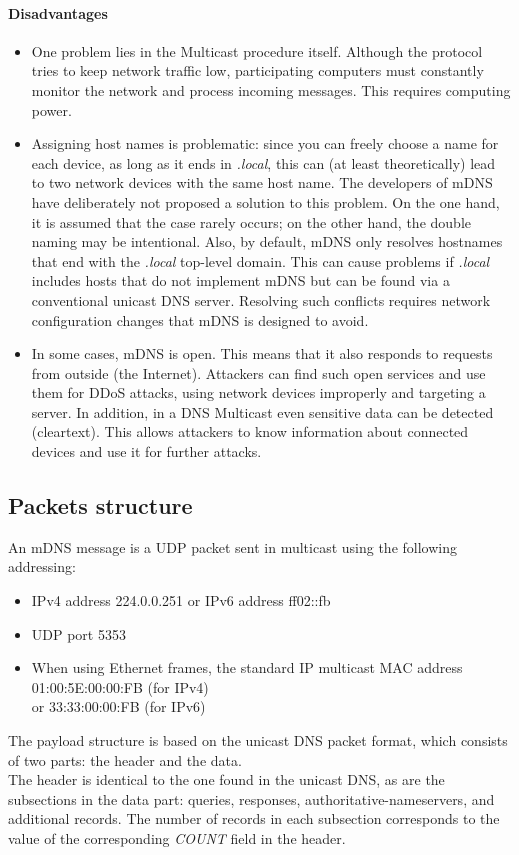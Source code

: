 \documentclass[fleqn, 10pt]{SelfArx} %
\begin{document}
\paragraph{Disadvantages} 
\begin{itemize}[leftmargin=*]
    \item One problem lies in the Multicast procedure itself. Although the protocol tries to keep network traffic low, participating computers must constantly monitor the network and process incoming messages. This requires computing power.
    \item Assigning host names is problematic: since you can freely choose a name for each device, as long as it ends in {\it{.local}}, this can (at least theoretically) lead to two network devices with the same host name.
The developers of mDNS have deliberately not proposed a solution to this problem. On the one hand, it is assumed that the case rarely occurs; on the other hand, the double naming may be intentional. Also, by default, mDNS only resolves hostnames that end with the {\it{.local}} top-level domain. This can cause problems if {\it{.local}} includes hosts that do not implement mDNS but can be found via a conventional unicast DNS server. Resolving such conflicts requires network configuration changes that mDNS is designed to avoid.
    \item In some cases, mDNS is open. This means that it also responds to requests from outside (the Internet). Attackers can find such open services and use them for DDoS attacks, using network devices improperly and targeting a server. In addition, in a DNS Multicast even sensitive data can be detected (cleartext). This allows attackers to know information about connected devices and use it for further attacks.
\end{itemize}

\subsection{Packets structure}
An mDNS message is a UDP packet sent in multicast using the following addressing:
\begin{itemize}[leftmargin=*]
    \item IPv4 address 224.0.0.251 or IPv6 address ff02::fb
    \item UDP port 5353
    \item When using Ethernet frames, the standard IP multicast MAC address 01:00:5E:00:00:FB (for IPv4) \\or 33:33:00:00:FB (for IPv6)
\end{itemize}
The payload structure is based on the unicast DNS packet format, which consists of two parts: the header and the data.\\
The header is identical to the one found in the unicast DNS, as are the subsections in the data part: queries, responses, authoritative-nameservers, and additional records. The number of records in each subsection corresponds to the value of the corresponding {\it{COUNT}} field in the header.
\end{document}
